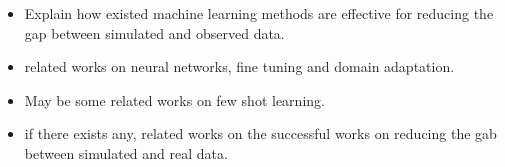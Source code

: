 \begin{itemize}
	\item Explain how existed machine learning methods are effective for reducing the gap between simulated and observed data.
    \item related works on neural networks, fine tuning and domain adaptation.
    \item May be some related works on few shot learning. 
    \item if there exists any, related works on the successful works on reducing the gab between  simulated and real data.
\end{itemize}
